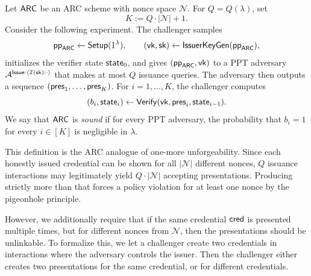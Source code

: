 \begin{definition}\label{def:arc-soundness}
Let \(\mathsf{ARC}\) be an ARC scheme with nonce space \(\mathcal{N}\). For \(Q=Q(\lambda)\), set
\[
K:=Q\cdot |\mathcal{N}|+1.
\]
Consider the following experiment. The challenger samples
\[
\mathsf{pp}_{\mathsf{ARC}}\gets \mathsf{Setup}(1^\lambda),\qquad (\mathsf{vk},\mathsf{sk})\gets \mathsf{IssuerKeyGen}(\mathsf{pp}_{\mathsf{ARC}}),
\]
initializes the verifier state \(\mathsf{state}_0\), and gives \((\mathsf{pp}_{\mathsf{ARC}},\mathsf{vk})\) to a PPT adversary
\(\mathcal{A}^{\mathsf{Issue}:\langle \mathcal{I}(\mathsf{sk}): \cdot \rangle}\) that makes at most \(Q\) issuance queries. The adversary then
outputs a sequence \((\mathsf{pres}_1,\ldots,\mathsf{pres}_K)\). For \(i=1,\ldots,K\), the challenger computes
\[
(b_i,\mathsf{state}_i)\gets \mathsf{Verify}(\mathsf{vk},\mathsf{pres}_i,\mathsf{state}_{i-1}).
\]
We say that \(\mathsf{ARC}\) is \emph{sound} if for every PPT adversary, the probability that \(b_i=1\) for every
\(i\in[K]\) is negligible in \(\lambda\).
\end{definition}

This definition is the ARC analogue of one-more unforgeability. Since each honestly issued credential can be shown for
all \(|\mathcal{N}|\) different nonces, \(Q\) issuance interactions may legitimately yield \(Q\cdot |\mathcal{N}|\)
accepting presentations. Producing strictly more than that forces a policy violation for at least one nonce by the
pigeonhole principle.

However, we additionally require that if the same credential \(\mathsf{cred}\) is presented multiple times, but for
different nonces from \(\mathcal{N}\), then the presentations should be unlinkable. To formalize this, we let a
challenger create two credentials in interactions where the adversary controls the issuer. Then the challenger either
creates two presentations for the same credential, or for different credentials.

